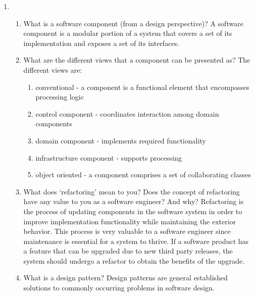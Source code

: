 \documentclass[12pt]{article}
\begin{document}
\begin{enumerate}


    \item
    \begin{enumerate}[start=1,align=left]
      \item What is a software component (from a design perspective)?
      A software component is a modular portion of a system that covers a set of its implementation and exposes a set of its interfaces.

      \item What are the different views that a component can be presented as? 
      The different views are:
      \begin{enumerate}
        \item conventional - a component is a functional element that encompasses processing logic
        \item control component - coordinates interaction among domain components
        \item domain component - implements required functionality
        \item infrastructure component - supports processing
        \item object oriented - a component comprises a set of collaborating classes
      \end{enumerate}

      \item What does ‘refactoring’ mean to you? Does the concept of refactoring have any value to you as a software engineer? And why? 
      Refactoring is the process of updating components in the software system in order to improve implementation functionality while maintaining the exterior behavior. This process is very valuable to a software engineer since maintenance is essential for a system to thrive. If a software product has a feature that can be upgraded due to new third party releases, the system should undergo a refactor to obtain the benefits of the upgrade.

      \item What is a design pattern? 
      Design patterns are general established solutions to commonly occurring problems in software design.


\end{enumerate}
\end{enumerate}
\end{document}
